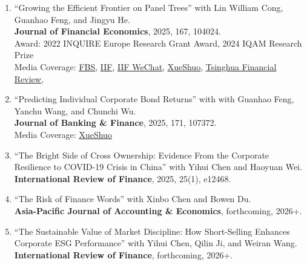 \documentclass{clean_cv}
\begin{document}
\begin{enumerate}
	\setlength\itemsep{1.0em}
	

	\item “Growing the Efficient Frontier on Panel Trees” 
		with Lin William Cong, Guanhao Feng, and Jingyu He. \\
		\textbf{Journal of Financial Economics}, 2025, 167, 104024. 
		\\
		Award:
			2022 INQUIRE Europe Research Grant Award,
			2024 IQAM Research Prize 
			\\
		Media Coverage: 
			\href{https://mp.weixin.qq.com/s/ePnIBXRj2YE-RSQkoWZTNw}{\underline{FBS}}, 
			\href{https://iif.ustc.edu.cn/2025/0220/c19557a674300/page.htm}{\underline{IIF}}, 
			\href{https://mp.weixin.qq.com/s/rUE0shWHWTzA0EEig2ImCA}{\underline{IIF WeChat}}, 
			\href{https://mp.weixin.qq.com/s/_hwltnHmtVf8iTVh62LhBQ}{\underline{XueShuo}},
			\href{http://thfr.com.cn/magazine_detail.php?id=149}{\underline{Tsinghua Financial Review}},
		
	\item “Predicting Individual Corporate Bond Returns” 
		with with Guanhao Feng, Yanchu Wang, and Chunchi Wu. \\
		\textbf{Journal of Banking \& Finance}, 2025, 171, 107372. \\
		Media Coverage: 
			\href{https://mp.weixin.qq.com/s/_hwltnHmtVf8iTVh62LhBQ}{\underline{XueShuo}}
			
	\item “The Bright Side of Cross Ownership: Evidence From the Corporate Resilience to COVID-19 Crisis in China” 
		with Yihui Chen and Haoyuan Wei. \\
		\textbf{International Review of Finance}, 2025, 25(1), e12468.

	\item “The Risk of Finance Words”
		with Xinbo Chen and Bowen Du. \\
		\textbf{Asia-Pacific Journal of Accounting \& Economics}, forthcoming, 2026+.

	\item “The Sustainable Value of Market Discipline: How Short-Selling Enhances Corporate ESG Performance”
		with Yihui Chen, Qilin Ji, and Weiran Wang. \\
		\textbf{International Review of Finance}, forthcoming, 2026+.
	
\end{enumerate}
\end{document}

